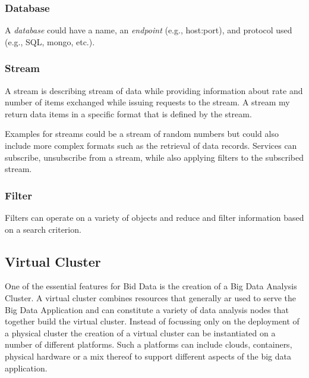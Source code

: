 \documentclass[10pt]{article}
\begin{document}

\subsubsection{Database}

A \textit{database} could have a name, an \textit{endpoint} (e.g., host:port),
and protocol used (e.g., SQL, mongo, etc.).


\subsubsection{Stream} 

A stream is describing stream of data while providing information about
rate and number of items exchanged while issuing requests to the
stream. A stream my return data items in a specific format that is
defined by the stream. 


Examples for streams could be a stream of random numbers but could
also include more complex formats such as the retrieval of data
records. Services can subscribe, unsubscribe from a stream, while also
applying filters to the subscribed stream.


\subsubsection{Filter} 

Filters can operate on a variety of objects and reduce and filter
information based on a search criterion.



\subsection{Virtual Cluster}\label{S:vc}

One of the essential features for Bid Data is the creation of a Big
Data Analysis Cluster.  A virtual cluster combines resources that
generally ar used to serve the Big Data Application and can constitute
a variety of data analysis nodes that together build the virtual
cluster. Instead of focussing only on the deployment of a physical
cluster the creation of a virtual cluster can be instantiated on a
number of different platforms. Such a platforms can include clouds,
containers, physical hardware or a mix thereof to support different
aspects of the big data application. 
\end{document}
